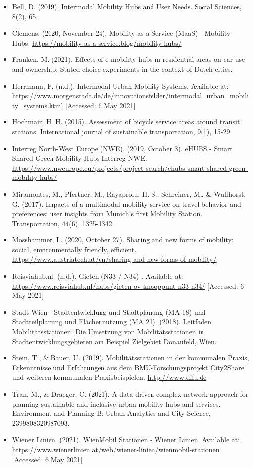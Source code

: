 \documentclass[
]{book}
\providecommand{\tightlist}{%
  \setlength{\itemsep}{0pt}\setlength{\parskip}{0pt}}
\begin{document}
\begin{itemize}
\tightlist
\item
  Bell, D. (2019). Intermodal Mobility Hubs and User Needs. Social Sciences, 8(2), 65.
\item
  Clemens. (2020, November 24). Mobility as a Service (MaaS) - Mobility Hubs. \url{https://mobility-as-a-service.blog/mobility-hubs/}
\item
  Franken, M. (2021). Effects of e-mobility hubs in residential areas on car use and ownership: Stated choice experiments in the context of Dutch cities.
\item
  Herrmann, F. (n.d.). Intermodal Urban Mobility Systems. Available at: \url{https://www.morgenstadt.de/de/innovationsfelder/intermodal_urban_mobility_systems.html} {[}Accessed: 6 May 2021{]}
\item
  Hochmair, H. H. (2015). Assessment of bicycle service areas around transit stations. International journal of sustainable transportation, 9(1), 15-29.
\item
  Interreg North-West Europe (NWE). (2019, October 3). eHUBS - Smart Shared Green Mobility Hubs \textbar{} Interreg NWE. \url{https://www.nweurope.eu/projects/project-search/ehubs-smart-shared-green-mobility-hubs/}
\item
  Miramontes, M., Pfertner, M., Rayaprolu, H. S., Schreiner, M., \& Wulfhorst, G. (2017). Impacts of a multimodal mobility service on travel behavior and preferences: user insights from Munich's first Mobility Station. Transportation, 44(6), 1325-1342.
\item
  Mosshammer, L. (2020, October 27). Sharing and new forms of mobility: social, environmentally friendly, efficient. \url{https://www.austriatech.at/en/sharing-and-new-forms-of-mobility/}
\item
  Reisviahub.nl. (n.d.). Gieten (N33 / N34) . Available at: \url{https://www.reisviahub.nl/hubs/gieten-ov-knooppunt-n33-n34/} {[}Accessed: 6 May 2021{]}
\item
  Stadt Wien - Stadtentwicklung und Stadtplanung (MA 18) und Stadtteilplanung und Flächennutzung (MA 21). (2018). Leitfaden Mobilitätsstationen: Die Umsetzung von Mobilitätsstationen in Stadtentwicklungsgebieten am Beispiel Zielgebiet Donaufeld, Wien.
\item
  Stein, T., \& Bauer, U. (2019). Mobilitätsstationen in der kommunalen Praxis, Erkenntnisse und Erfahrungen aus dem BMU-Forschungsprojekt City2Share und weiteren kommunalen Praxisbeispielen. \url{http://www.difu.de}
\item
  Tran, M., \& Draeger, C. (2021). A data-driven complex network approach for planning sustainable and inclusive urban mobility hubs and services. Environment and Planning B: Urban Analytics and City Science, 2399808320987093.
\item
  Wiener Linien. (2021). WienMobil Stationen - Wiener Linien. Available at: \url{https://www.wienerlinien.at/web/wiener-linien/wienmobil-stationen} {[}Accessed: 6 May 2021{]}
\end{itemize}
\end{document}
